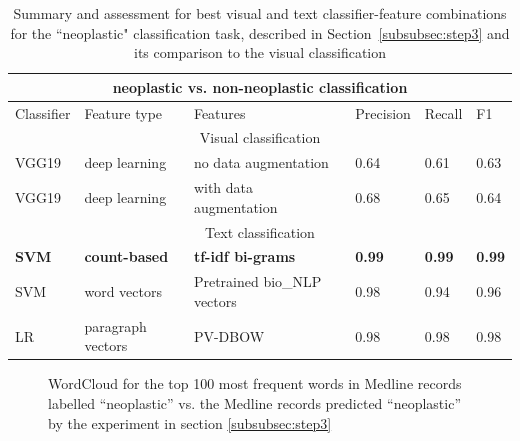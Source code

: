 \documentclass[]{spie}  %
\begin{document}
\begin{table}[ht]
\caption{Summary and assessment for best visual and text classifier-feature combinations for the ``neoplastic" classification task, described in Section~\ref{subsubsec:step3} and its comparison to the visual classification}
\label{table:2}
\centering
\begin{tabular}{ |p{1.5cm}|p{3.0cm}|p{5.0cm}|p{1.5cm}|p{1.5cm}|p{1.5cm}|  }
 \hline
 \multicolumn{6}{|c|}{neoplastic vs. non-neoplastic classification} \\
 \hline
 Classifier  & Feature type & Features & Precision & Recall & F1\\
 \hline
\multicolumn{6}{|c|}{Visual classification} \\
\hline
VGG19 & deep learning & no data augmentation & 0.64 & 0.61 & 0.63 \\
VGG19 & deep learning & with data augmentation & 0.68 & 0.65 & 0.64 \\
\hline
\multicolumn{6}{|c|}{Text classification} \\
\hline
\textbf{SVM} & \textbf{count-based}   & \textbf{tf-idf bi-grams}    & \textbf{0.99} &  \textbf{0.99} &   \textbf{0.99} \\
 SVM & word vectors  &  Pretrained bio\_NLP vectors  & 0.98 &  0.94 &   0.96\\
 LR & paragraph vectors  & PV-DBOW & 0.98 & 0.98 & 0.98 \\
 \hline
 \end{tabular}
\end{table}
\vspace{5mm}
%
\begin{figure}%
    \centering
    \caption{WordCloud for the top 100 most frequent words in Medline records labelled ``neoplastic'' vs. the Medline records predicted ``neoplastic'' by the experiment in section \ref{subsubsec:step3}}%
    \label{fig:wordcloud_neoplasm}
\end{figure}
\end{document}
